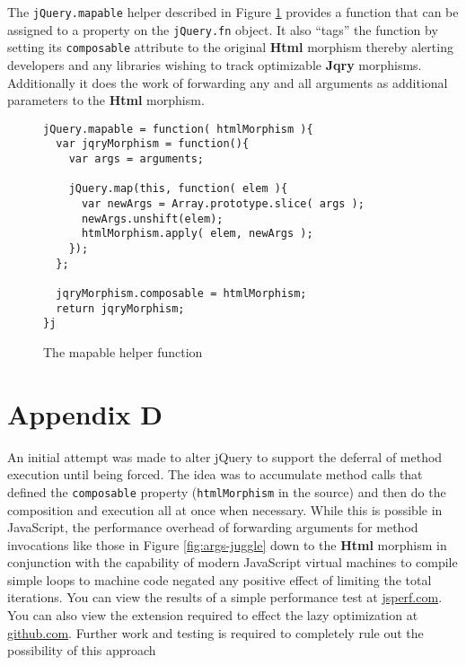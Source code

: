 \documentclass[preprint, leqno]{sigplanconf}
\begin{document}
The \verb|jQuery.mapable| helper described in Figure \ref{fig:mapable} provides a function that can be assigned to a property on the \verb|jQuery.fn| object. It also ``tags'' the function by setting its \verb|composable| attribute to the original \textbf{Html} morphism thereby alerting developers and any libraries wishing to track optimizable \textbf{Jqry} morphisms. Additionally it does the work of forwarding any and all arguments as additional parameters to the \textbf{Html} morphism.

\begin{figure}[!ht]
\small
\begin{verbatim}
jQuery.mapable = function( htmlMorphism ){
  var jqryMorphism = function(){
    var args = arguments;

    jQuery.map(this, function( elem ){
      var newArgs = Array.prototype.slice( args );
      newArgs.unshift(elem);
      htmlMorphism.apply( elem, newArgs );
    });
  };

  jqryMorphism.composable = htmlMorphism;
  return jqryMorphism;
}j
\end{verbatim}
\nocaptionrule \caption{The mapable helper function}
\label{fig:mapable}
\end{figure}

\section{Appendix D}

An initial attempt was made to alter jQuery to support the deferral of method execution until being forced. The idea was to accumulate method calls that defined the \verb|composable| property (\verb|htmlMorphism| in the source) and then do the composition and execution all at once when necessary. While this is possible in JavaScript, the performance overhead of forwarding arguments for method invocations like those in Figure \ref{fig:args-juggle} down to the \textbf{Html} morphism in conjunction with the capability of modern JavaScript virtual machines to compile simple loops to machine code negated any positive effect of limiting the total iterations. You can view the results of a simple performance test at \href{http://jsperf.com/lazy-loop-fusion-vs-traditional-method-chaning/5}{jsperf.com}. You can also view the extension required to effect the lazy optimization at \href{https://github.com/johnbender/jquery-lazy-proxy/blob/79ab61e22547169d6f392512f782df2e29362ebc/lazy.js}{github.com}. Further work and testing is required to completely rule out the possibility of this approach
\end{document}
